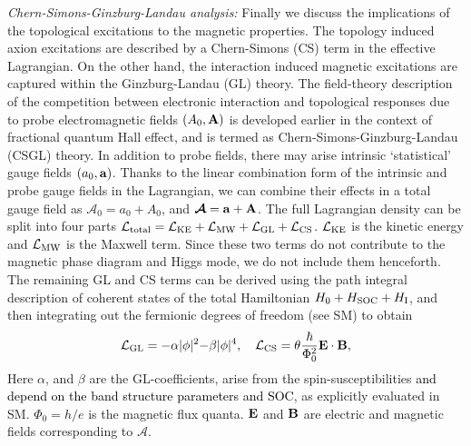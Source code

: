 \documentclass[aps,prl,showpacs,twocolumn,groupedaddress]{revtex4-1}
\newcommand{\blue}{\textcolor{black}}
\begin{document}
{\it Chern-Simons-Ginzburg-Landau analysis:} Finally we discuss the implications of the topological excitations to the magnetic properties. The topology induced axion excitations are described by a Chern-Simons (CS) term in the effective Lagrangian.\cite{zhang_prb,JMoore} On the other hand, the interaction induced  magnetic excitations are captured within the Ginzburg-Landau (GL) theory. The field-theory description of the competition between electronic interaction and topological responses due to probe electromagnetic fields $(A_0, {\bf A})$ is developed earlier in the context of fractional quantum Hall effect,\cite{CSGL} and is termed as Chern-Simons-Ginzburg-Landau (CSGL) theory. In addition to probe fields, there may arise intrinsic `statistical' gauge fields $(a_0, {\bf a})$. Thanks to the linear combination form of the intrinsic and probe gauge fields in the Lagrangian, we can combine their effects in a total gauge field as $\mathcal{A}_0=a_0+A_0$, and $\bm{\mathcal{A}}={\bf a}+{\bf A}$. The full Lagrangian density can be split into four parts\cite{CSGL,foot_CSGL} $\mathcal{L}_{\rm total}=\mathcal{L}_{\rm KE} + \mathcal{L}_{\rm MW} + \mathcal{L}_{\rm GL} + \mathcal{L}_{\rm CS}$. $\mathcal{L}_{\rm KE}$ is the kinetic energy and $\mathcal{L}_{\rm MW}$ is the Maxwell term. Since these two terms do not contribute to the magnetic phase diagram and Higgs mode, we do not include them henceforth.\cite{SM} The remaining GL and CS terms can be derived using the path integral description of coherent states of the total Hamiltonian $H_0+H_{\rm SOC}+H_{\rm I}$, and then integrating out the fermionic degrees of freedom (see SM\cite{SM}) to obtain
\begin{eqnarray}
%
\mathcal{L}_{\rm GL} = \blue{-}\alpha|\phi|^2 \blue{-} \beta|\phi|^4, ~~~\mathcal{L}_{\rm CS} = \theta \frac{\hbar}{\Phi_0^2}{\bf E}\cdot{\bf B},
\label{Eq:CS}
%
\end{eqnarray}
Here $\alpha$, and $\beta$ are the GL-coefficients, arise from the spin-susceptibilities \blue{and depend on the band structure parameters and SOC}, as explicitly evaluated in SM\cite{SM}. $\Phi_0=h/e$ is the magnetic flux quanta. ${\bf E}$ and ${\bf B}$ are electric and magnetic fields corresponding to $\bm{\mathcal{A}}$. 
\end{document}
